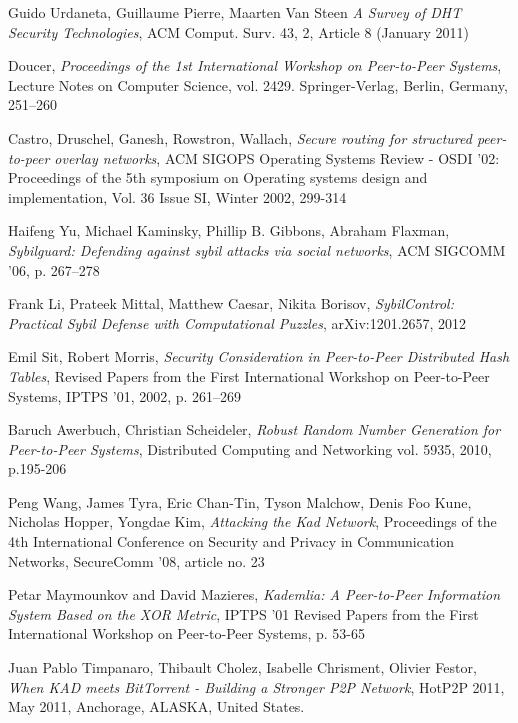 \begin{thebibliography}{99}

 Guido Urdaneta, Guillaume Pierre, Maarten Van Steen
\textit{A Survey of DHT Security Technologies}, ACM Comput. Surv.  43, 2,
Article 8 (January 2011)

 Doucer, \textit{Proceedings of the 1st International
Workshop on Peer-to-Peer Systems}, Lecture Notes on Computer Science, vol. 2429.
Springer-Verlag, Berlin, Germany, 251–260

 Castro, Druschel, Ganesh, Rowstron, Wallach,
\textit{Secure routing for structured peer-to-peer overlay networks},
ACM SIGOPS Operating Systems Review - OSDI '02: Proceedings of the 5th symposium
on Operating systems design and implementation,
Vol. 36 Issue SI, Winter 2002,
299-314

Haifeng Yu, Michael Kaminsky, Phillip B. Gibbons, Abraham Flaxman,
\textit{Sybilguard: Defending against sybil attacks via social networks},
ACM SIGCOMM ’06, p. 267--278

Frank Li, Prateek Mittal, Matthew Caesar, Nikita Borisov,
\textit{SybilControl: Practical Sybil Defense with Computational Puzzles},
arXiv:1201.2657, 2012

Emil Sit, Robert Morris,
\textit{Security Consideration in Peer-to-Peer Distributed Hash Tables},
Revised Papers from the First International Workshop on Peer-to-Peer Systems,
IPTPS '01, 2002, p. 261--269

Baruch Awerbuch, Christian Scheideler,
\textit{Robust Random Number Generation for Peer-to-Peer Systems},
Distributed Computing and Networking vol. 5935, 2010, p.195-206

Peng Wang, James Tyra, Eric Chan-Tin, Tyson Malchow, Denis Foo Kune, Nicholas
Hopper, Yongdae Kim,
\textit{Attacking the Kad Network},
Proceedings of the 4th International Conference on Security and Privacy in
Communication Networks, SecureComm '08, article no. 23

Petar Maymounkov and David Mazieres,
\textit{Kademlia: A Peer-to-Peer Information System Based on the XOR Metric},
IPTPS '01 Revised Papers from the First International Workshop on Peer-to-Peer
Systems, p. 53-65

Juan Pablo Timpanaro, Thibault Cholez, Isabelle Chrisment, Olivier Festor,
\textit{When KAD meets BitTorrent - Building a Stronger P2P Network},
HotP2P 2011, May 2011, Anchorage, ALASKA, United States.


\end{thebibliography}
